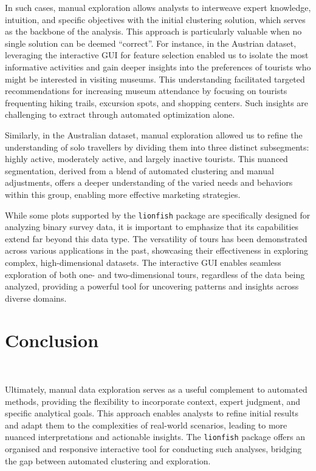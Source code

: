\documentclass[article]{ajs}
\begin{document}
In such cases, manual exploration allows analysts to interweave expert knowledge, intuition, and specific objectives with the initial clustering solution, which serves as the backbone of the analysis. This approach is particularly valuable when no single solution can be deemed “correct''. For instance, in the Austrian dataset, leveraging the interactive GUI for feature selection enabled us to isolate the most informative activities and gain deeper insights into the preferences of tourists who might be interested in visiting museums. This understanding facilitated targeted recommendations for increasing museum attendance by focusing on tourists frequenting hiking trails, excursion spots, and shopping centers. Such insights are challenging to extract through automated optimization alone.

Similarly, in the Australian dataset, manual exploration allowed us to refine the understanding of solo travellers by dividing them into three distinct subsegments: highly active, moderately active, and largely inactive tourists. This nuanced segmentation, derived from a blend of automated clustering and manual adjustments, offers a deeper understanding of the varied needs and behaviors within this group, enabling more effective marketing strategies.

While some plots supported by the \texttt{lionfish} package are specifically designed for analyzing binary survey data, it is important to emphasize that its capabilities extend far beyond this data type. The versatility of tours has been demonstrated across various applications in the past, showcasing their effectiveness in exploring complex, high-dimensional datasets. The interactive GUI enables seamless exploration of both one- and two-dimensional tours, regardless of the data being analyzed, providing a powerful tool for uncovering patterns and insights across diverse domains.


\section{Conclusion}~\label{conclusion}

Ultimately, manual data exploration serves as a useful complement to automated methods, providing the flexibility to incorporate context, expert judgment, and specific analytical goals. This approach enables analysts to refine initial results and adapt them to the complexities of real-world scenarios, leading to more nuanced interpretations and actionable insights. The \texttt{lionfish} package offers an organised and responsive interactive tool for conducting such analyses, bridging the gap between automated clustering and exploration.
\end{document}
